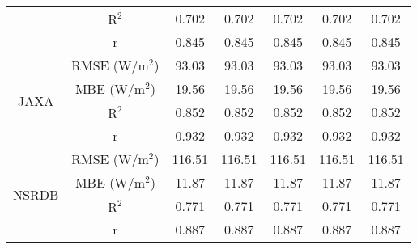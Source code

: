 \begin{table}[H]
{\begin{tabular}{ccccccc}
                                           & $\mathrm{R^{2}}$          & 0.702  & 0.702  & 0.702  & 0.702  & 0.702  \\
                                           & r                         & 0.845  & 0.845  & 0.845  & 0.845  & 0.845  \\ \cline{2-7}
            \multirow{4}{*}{JAXA}          & RMSE ($\mathrm{W/m^{2}}$) & 93.03  & 93.03  & 93.03  & 93.03  & 93.03  \\
                                           & MBE ($\mathrm{W/m^{2}}$)  & 19.56  & 19.56  & 19.56  & 19.56  & 19.56  \\
                                           & $\mathrm{R^{2}}$          & 0.852  & 0.852  & 0.852  & 0.852  & 0.852  \\
                                           & r                         & 0.932  & 0.932  & 0.932  & 0.932  & 0.932  \\ \cline{2-7}
            \multirow{4}{*}{NSRDB}         & RMSE ($\mathrm{W/m^{2}}$) & 116.51 & 116.51 & 116.51 & 116.51 & 116.51 \\
                                           & MBE ($\mathrm{W/m^{2}}$)  & 11.87  & 11.87  & 11.87  & 11.87  & 11.87  \\
                                           & $\mathrm{R^{2}}$          & 0.771  & 0.771  & 0.771  & 0.771  & 0.771  \\
                                           & r                         & 0.887  & 0.887  & 0.887  & 0.887  & 0.887  \\ \hline
        \end{tabular}
    }
    \label{table:QIENet_SIndex}
\end{table}